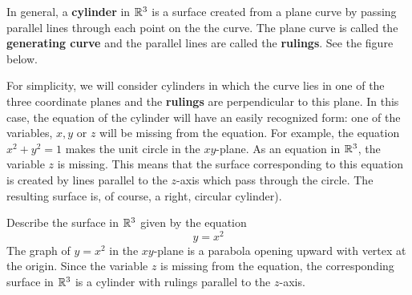 \documentclass[handout]{ximera}
\begin{document}
In general, a \textbf{cylinder} in $\mathbb R^3$ is a surface created from a plane curve by passing parallel lines 
through each point on the the curve. The plane curve is called the \textbf{generating curve} and the parallel 
lines are called the \textbf{rulings}. See the figure below.
\begin{image}
\end{image}




For simplicity, we will consider cylinders in which the curve lies in one of the 
three coordinate planes and the {\bf rulings} are perpendicular to this plane.
In this case, the equation of the cylinder will have an easily recognized form: 
one of the variables, $x, y$ or $z$ will be missing from the equation.
For example, the equation $x^2+y^2 = 1$ makes the unit circle in the $xy$-plane.  
As an equation in $\mathbb R^3$, the variable $z$ is missing.  
This means that the surface corresponding to this equation is created by lines 
parallel to the $z$-axis which pass through the circle.
The resulting surface is, of course, a right, circular cylinder).
\begin{example}[Example 1]
Describe the surface in $\mathbb R^3$ given by the equation
\[
y= x^2
\]
The graph of $y = x^2$ in the $xy$-plane is a parabola opening upward with vertex at the origin.
Since the variable $z$ is missing from the equation, the corresponding surface in $\mathbb R^3$
is a cylinder with rulings parallel to the $z$-axis.
\end{example}
\end{document}
